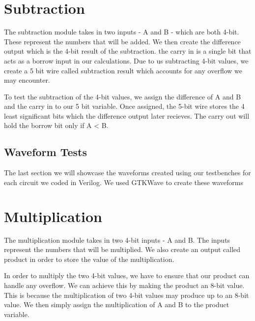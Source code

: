 \documentclass[12pt]{article}
\begin{document}
\section{Subtraction}
The subtraction module takes in two inputs - A and B - which are both 4-bit. These represent the numbers that will be added. We then create the difference output which is the 4-bit result of the subtraction. the carry in is a single bit that acts as a borrow input in our calculations. Due to us subtracting 4-bit values, we create a 5 bit wire called subtraction result which accounts for any overflow we may encounter. 


To test the subtraction of the 4-bit values, we assign the difference of A and B and the carry in to our 5 bit variable. Once assigned, the 5-bit wire stores the 4 least significant bits which the difference output later recieves. The carry out will hold the borrow bit only if A < B.





\subsection{Waveform Tests}

The last section we will showcase the waveforms created using our testbenches for each circuit we coded in Verilog. We used GTKWave to create these waveforms










\section{Multiplication}
The multiplication module takes in two 4-bit inputs - A and B. The inputs represent the numbers that will be multiplied. We also create an output called product in order to store the value of the multiplication.


In order to multiply the two 4-bit values, we have to ensure that our product can handle any overflow. We can achieve this by making the product an 8-bit value. This is because the multiplication of two 4-bit values may produce up to an 8-bit value. We then simply assign the multiplication of A and B to the product variable.

\end{document}
